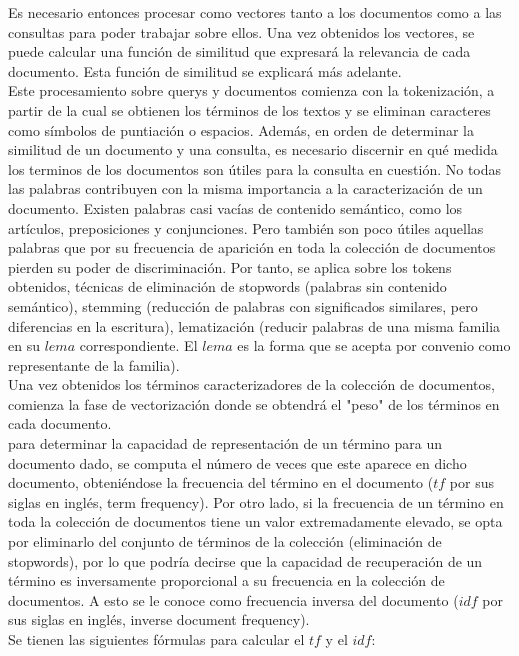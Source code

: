 \documentclass[runningheads,a4paper]{llncs}
\begin{document}
Es necesario entonces procesar como vectores tanto a los documentos como a las consultas para poder trabajar sobre ellos. Una vez obtenidos los vectores, se puede calcular una función de similitud que expresará la relevancia de cada documento. Esta función de similitud se explicará más adelante. \\
Este procesamiento sobre querys y documentos comienza con la tokenización, a partir de la cual se obtienen los términos de los textos y se eliminan caracteres como símbolos de puntiación o espacios. Además, en orden de determinar la similitud de un documento y una consulta, es necesario discernir en qué medida los terminos de los documentos son útiles para la consulta en cuestión. No todas las palabras contribuyen con la misma importancia a la caracterización de un documento. Existen palabras casi vacías de contenido semántico, como los artículos, preposiciones y conjunciones. Pero también son poco útiles aquellas palabras que por su frecuencia de aparición en toda la colección de documentos pierden su poder de discriminación. Por tanto, se aplica sobre los tokens obtenidos, técnicas de eliminación de stopwords (palabras sin contenido semántico), stemming (reducción de palabras con significados similares, pero diferencias en la escritura), lematización (reducir palabras de una misma familia en su $lema$ correspondiente. El $lema$ es la forma que se acepta por convenio como representante de la familia). \\

Una vez obtenidos los términos caracterizadores de la colección de documentos, comienza la fase de vectorización donde se obtendrá el "peso" de los términos en cada documento.\\
para determinar la capacidad de representación de un término para un documento dado, se computa el número de veces que este aparece en dicho documento, obteniéndose la frecuencia del término en el documento ($tf$ por sus siglas en inglés, term frequency). Por otro lado, si la frecuencia de un término en toda la colección de documentos tiene un valor extremadamente elevado, se opta por eliminarlo del conjunto de términos de la colección (eliminación de stopwords), por lo que podría decirse que la capacidad de recuperación de un término es inversamente proporcional a su frecuencia en la colección de documentos. A esto se le conoce como frecuencia inversa del documento ($idf$ por sus siglas en inglés, inverse document frequency).\\

Se tienen las siguientes fórmulas para calcular el $tf$ y el $idf$:
\end{document}
